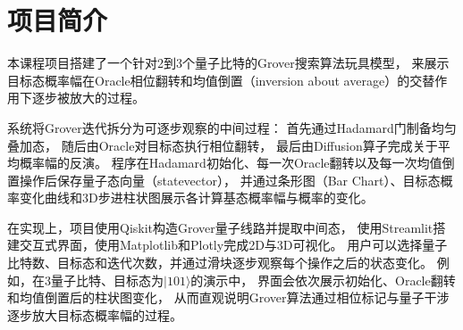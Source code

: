\section{项目简介}

本课程项目搭建了一个针对2到3个量子比特的Grover搜索算法玩具模型，
来展示目标态概率幅在Oracle相位翻转和均值倒置（inversion about average）的交替作用下逐步被放大的过程。

系统将Grover迭代拆分为可逐步观察的中间过程：
首先通过Hadamard门制备均匀叠加态，
随后由Oracle对目标态执行相位翻转，
最后由Diffusion算子完成关于平均概率幅的反演。
程序在Hadamard初始化、每一次Oracle翻转以及每一次均值倒置操作后保存量子态向量（statevector），
并通过条形图（Bar Chart）、目标态概率变化曲线和3D步进柱状图展示各计算基态概率幅与概率的变化。

在实现上，项目使用Qiskit构造Grover量子线路并提取中间态，
使用Streamlit搭建交互式界面，使用Matplotlib和Plotly完成2D与3D可视化。
用户可以选择量子比特数、目标态和迭代次数，并通过滑块逐步观察每个操作之后的状态变化。
例如，在3量子比特、目标态为\(|101\rangle\)的演示中，
界面会依次展示初始化、Oracle翻转和均值倒置后的柱状图变化，
从而直观说明Grover算法通过相位标记与量子干涉逐步放大目标态概率幅的过程。
